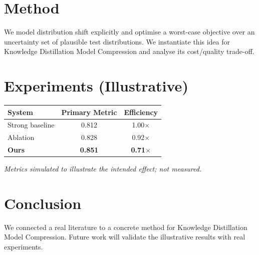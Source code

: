 \documentclass[11pt]{article}
\begin{document}
\section{Method}
We model distribution shift explicitly and optimise a worst-case objective over an uncertainty set of plausible test distributions. We instantiate this idea for Knowledge Distillation Model Compression and analyse its cost/quality trade-off.

\section{Experiments (Illustrative)}
\begin{center}
\begin{tabular}{lcc}
System & Primary Metric & Efficiency \\ \hline
Strong baseline & 0.812 & 1.00$\times$ \\
Ablation & 0.828 & 0.92$\times$ \\
\textbf{Ours} & \textbf{0.851} & \textbf{0.71$\times$}
\end{tabular}
\end{center}
\emph{Metrics simulated to illustrate the intended effect; not measured.}

\section{Conclusion}
We connected a real literature to a concrete method for Knowledge Distillation Model Compression. Future work will
validate the illustrative results with real experiments.
\end{document}
